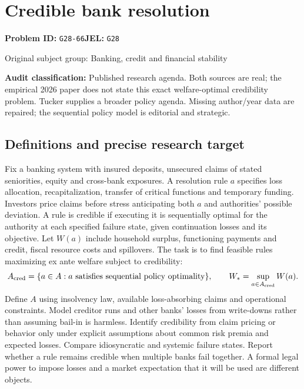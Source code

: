\documentclass[11pt,a4paper]{article}
\begin{document}
\section*{Credible bank resolution}
\textbf{Problem ID:} \texttt{G28-66}\quad \textbf{JEL:} \texttt{G28}\par
\label{problem:OP-0327}
{\sffamily\small\color{muted}Original subject group: Banking, credit and financial stability\par}
\label{definitions:problem:30007609}
\textbf{Audit classification:} Published research agenda. Both sources are real; the empirical 2026 paper does not state this exact welfare-optimal credibility problem. Tucker supplies a broader policy agenda. Missing author/year data are repaired; the sequential policy model is editorial and strategic.
\subsection*{Definitions and precise research target}
Fix a banking system with insured deposits, unsecured claims of stated seniorities, equity and cross-bank exposures. A resolution rule \(a\) specifies loss allocation, recapitalization, transfer of critical functions and temporary funding. Investors price claims before stress anticipating both \(a\) and authorities' possible deviation. A rule is credible if executing it is sequentially optimal for the authority at each specified failure state, given continuation losses and its objective. Let \(W(a)\) include household surplus, functioning payments and credit, fiscal resource costs and spillovers. The task is to find feasible rules maximizing ex ante welfare subject to credibility:
\[A_{\rm cred}=\{a\in A:a\text{ satisfies sequential policy optimality}\},\qquad W_*=\sup_{a\in A_{\rm cred}}W(a).\]
Define \(A\) using insolvency law, available loss-absorbing claims and operational constraints. Model creditor runs and other banks' losses from write-downs rather than assuming bail-in is harmless. Identify credibility from claim pricing or behavior only under explicit assumptions about common risk premia and expected losses. Compare idiosyncratic and systemic failure states. Report whether a rule remains credible when multiple banks fail together. A formal legal power to impose losses and a market expectation that it will be used are different objects.
\end{document}
